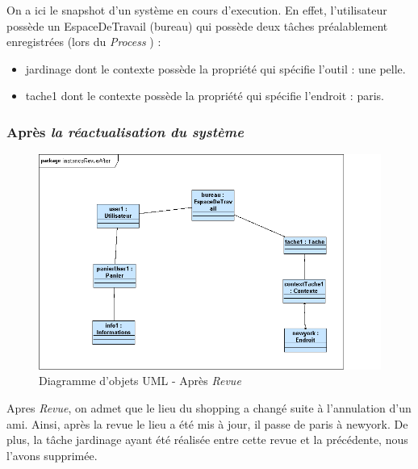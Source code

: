 	\bigskip

	On a ici le snapshot d'un système en cours d'execution. En effet, l'utilisateur possède un EspaceDeTravail (bureau) qui possède deux tâches préalablement enregistrées (lors du \textit{Process} ) :\\
	\begin{itemize}
\item jardinage dont le contexte possède la propriété qui spécifie l'outil : une pelle.
\item tache1 dont le contexte possède la propriété qui spécifie l'endroit : paris.
\end{itemize}


\subsubsection {Après \textit{la réactualisation du système}}

\begin{figure}[H]
	\begin{center}
	\includegraphics[scale=0.5]{diagrams/InstantaneRevueAfter.png}
	\caption{Diagramme d'objets UML  - Après \textit{Revue}}
	\end{center}
\end{figure}
	
	\bigskip

	Apres \textit{Revue}, on admet que le lieu du shopping a changé suite à l'annulation d'un ami. Ainsi, après la revue le lieu a été mis à jour, il passe de paris à newyork. De plus, la tâche jardinage ayant été réalisée entre cette revue et la précédente, nous l'avons supprimée.
